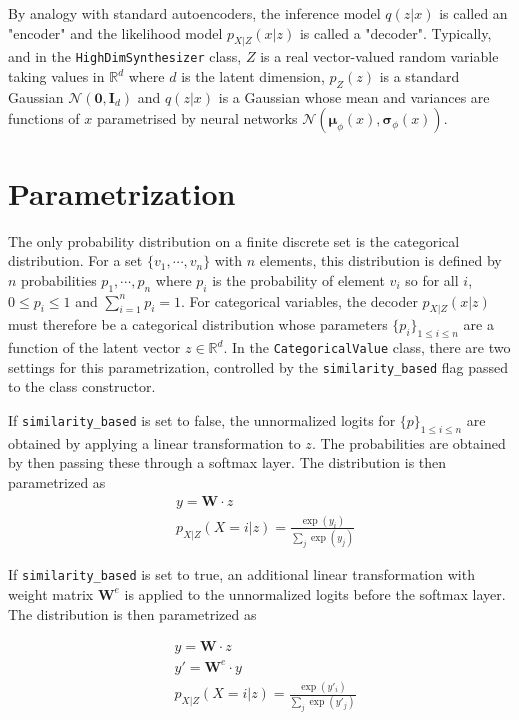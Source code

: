\documentclass[11pt]{article}
\begin{document}
By analogy with standard autoencoders, the inference 
model \(q(z|x)\) is called an "encoder" and the likelihood model \(p_{X|Z}(x|z)\) is called a "decoder". Typically, and in the \texttt{HighDimSynthesizer} class, \(Z\) is a real vector-valued random variable taking values in \(\mathbb{R}^d\) where \(d\) is the latent dimension, \(p_{Z}(z)\) is a standard Gaussian \(\mathcal{N}(\mathbf{0}, \mathbf{I}_d)\) and \(q(z|x)\) is a Gaussian whose mean and variances are functions of \(x\) parametrised by neural networks \(\mathcal{N}(\boldsymbol{\mu}_{\phi}(x), \boldsymbol{\sigma}_{\phi}(x))\).

\section{Parametrization}
\label{sec:org23777f6}

 The only probability distribution on a finite discrete set is the categorical distribution. For a set \(\{v_1, \cdots, v_n\}\)
 with \(n\) elements, this distribution is defined by \(n\) probabilities \(p_1, \cdots, p_n\) where \(p_i\) is the probability of element \(v_i\) so
 for all \(i\), 
\(0\leq p_i\leq1\) and \(\displaystyle\sum_{i=1}^n p_i = 1\). For categorical variables, the decoder \(p_{X|Z}(x|z)\) must therefore be a categorical distribution whose parameters \(\{p_i\}_{1\leq i\leq n}\) are a function of the latent vector \(z\in\mathbb{R}^d\). In the \texttt{CategoricalValue} class, there are two settings for this parametrization, controlled by the \texttt{similarity\_based} flag passed to the class constructor.

If \texttt{similarity\_based} is set to false, the unnormalized logits for \(\{p\}_{1\leq i \leq n}\) are obtained by applying a linear transformation to \(z\). The probabilities are obtained by then passing these through a softmax layer. The distribution is then parametrized as
\begin{equation}
\begin{split}
&y = \mathbf{W}\cdot z\\
&p_{X|Z}(X=i|z) = \frac{\exp(y_i)}{\displaystyle\sum_{j}\exp(y_j)}
 \end{split}
\end{equation}

If \texttt{similarity\_based} is set to true, an additional linear transformation with weight matrix \(\mathbf{W}^e\) is applied to the unnormalized logits before the softmax layer. The distribution is then parametrized as

\begin{equation}
\begin{split}
&y = \mathbf{W}\cdot z\\
&y' = \mathbf{W}^e\cdot y\\
&p_{X|Z}(X=i|z) = \frac{\exp(y'_i)}{\displaystyle\sum_{j}\exp(y'_j)}
 \end{split}
\end{equation}
\end{document}
